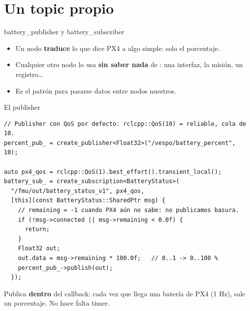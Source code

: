 \section{Un topic propio}

\begin{frame}{battery\_publisher y battery\_subscriber}
  \centering
  \vspace{0.6em}
  \begin{itemize}\small
    \item Un nodo \textbf{traduce} lo que dice PX4 a algo simple: solo el porcentaje.
    \item Cualquier otro nodo lo usa \textbf{sin saber nada} de : una interfaz, la misión, un
      registro\ldots
    \item Es el patrón para pasarse datos entre nodos nuestros.
  \end{itemize}
\end{frame}

\begin{frame}[fragile]{El publisher}
  \begin{lstlisting}[style=cpp,caption={battery\_publisher.cpp}]
// Publisher con QoS por defecto: rclcpp::QoS(10) = reliable, cola de 10.
percent_pub_ = create_publisher<Float32>("/vespo/battery_percent", 10);

auto px4_qos = rclcpp::QoS(1).best_effort().transient_local();
battery_sub_ = create_subscription<BatteryStatus>(
  "/fmu/out/battery_status_v1", px4_qos,
  [this](const BatteryStatus::SharedPtr msg) {
    // remaining = -1 cuando PX4 aún no sabe: no publicamos basura.
    if (!msg->connected || msg->remaining < 0.0f) {
      return;
    }
    Float32 out;
    out.data = msg->remaining * 100.0f;   // 0..1 -> 0..100 %
    percent_pub_->publish(out);
  });
  \end{lstlisting}
  \small Publica \textbf{dentro} del callback: cada vez que llega una batería de PX4 (1 Hz), sale un
  porcentaje. No hace falta timer.
\end{frame}

